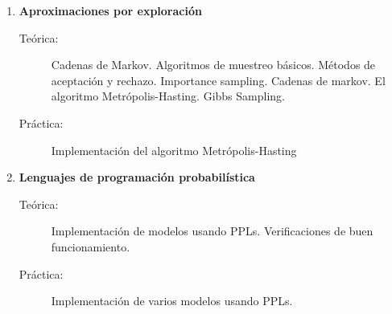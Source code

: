 \documentclass[10pt]{article}
\begin{document}
\begin{enumerate}

\vspace{0.1cm}
\item \textbf{Aproximaciones por exploración}
\vspace{-0.15cm}
\begin{description}
\item[Teórica:] Cadenas de Markov. Algoritmos de muestreo básicos. Métodos de aceptación y rechazo. Importance sampling. Cadenas de markov. El algoritmo Metrópolis-Hasting. Gibbs Sampling.
\item[Práctica:] Implementación del algoritmo Metrópolis-Hasting
\end{description}


\vspace{0.1cm}
\item \textbf{Lenguajes de programación probabilística}
\vspace{-0.15cm}
\begin{description}
\item[Teórica:] Implementación de modelos usando PPLs. Verificaciones de buen funcionamiento. 
\item[Práctica:] Implementación de varios modelos usando PPLs.
\end{description}


\end{enumerate}

\nocite{jaynes1984-bayesianBackground, mcelreath2020-rethinking, bishop2006-PRML, pearl2009-causality, cinelli2021-crashCourse, stan-userGuide, martin2021-BMCP, samaja1999-epistemologiaMetodologia }

{

}
\end{document}

